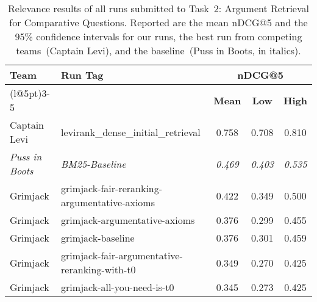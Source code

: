 \begin{table}[t]
\centering
\footnotesize
\renewcommand{\tabcolsep}{5pt}
\caption{Relevance results of all runs submitted to Task~2: Argument Retrieval for Comparative Questions. Reported are the mean nDCG@5 and the 95\% confidence intervals for our runs, the best run from competing teams~(Captain Levi), and the baseline~(Puss in Boots, in italics).}
\label{table-results-relevance}
\begin{tabular}{@{}llccc@{}}
\toprule
\textbf{Team} & \textbf{Run Tag} & \multicolumn{3}{c}{\textbf{nDCG@5}} \\
\cmidrule(l@{\tabcolsep}){3-5}
& & \textbf{Mean} & \textbf{Low} & \textbf{High} \\
\midrule
Captain Levi~\cite{RanaGJCEHP2022} & levirank\_dense\_initial\_retrieval & 0.758 & 0.708 & 0.810 \\
\textit{Puss in Boots}~\cite{BondarenkoFKSGBPBSWPH2022} & \textit{BM25-Baseline} & \textit{0.469} & \textit{0.403} & \textit{0.535} \\
Grimjack & grimjack-fair-reranking-argumentative-axioms & 0.422 & 0.349 & 0.500 \\
Grimjack & grimjack-argumentative-axioms & 0.376 & 0.299 & 0.455 \\
Grimjack & grimjack-baseline & 0.376 & 0.301 & 0.459 \\
Grimjack & grimjack-fair-argumentative-reranking-with-t0 & 0.349 & 0.270 & 0.425 \\
Grimjack & grimjack-all-you-need-is-t0 & 0.345 & 0.273 & 0.425 \\
\bottomrule
\end{tabular}
\end{table}
